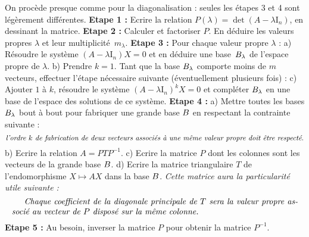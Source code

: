 On proc\`ede presque comme pour la diagonalisation : seules les \'etapes 3 et 4 sont l\'eg\`erement diff\'erentes. 
\medskip
\noindent
{\bf Etape 1 : }Ecrire la relation $P(\lambda)=\det(A-\lambda\mbox{I}_n)$, en dessinant la matrice. \medskip\noindent
\medskip
\noindent
{\bf Etape 2 : }Calculer et factoriser $P$. En d\'eduire les valeurs propres $\lambda$ et leur multiplicit\'e~$m_\lambda$.\medskip\noindent
\medskip
\noindent
{\bf Etape 3 : }Pour chaque valeur propre $\lambda$ : \pn 
a) R\'esoudre le syst\`eme $(A-\lambda\mbox{I}_n)X=0$ et en d\'eduire une base~$\sc B_\lambda$ de l'espace propre de $\lambda$. \pn
b) Prendre $k=1$. Tant que la base $\sc B_\lambda$ comporte moins de $m$ vecteurs, effectuer l'\'etape n\'ecessaire suivante (\'eventuellement plusieurs fois) :
c) Ajouter $1$ \`a $k$, r\'esoudre le syst\`eme $(A-\lambda\mbox{I}_n)^kX=0$ et compl\'eter $\sc B_\lambda$ en une base de l'espace des solutions de ce syst\`eme. 
\medskip\noindent
{\bf Etape 4 : } a) Mettre toutes les bases $\sc B_\lambda$ bout \`a bout pour fabriquer une grande base $\sc B$ en respectant la contrainte suivante : 
$$
\mbox{\it l'ordre $k$ de fabrication de deux vecteurs associ\'es \`a une m\^eme valeur propre doit \^etre respect\'e}. 
$$
b) Ecrire la relation $A=PTP^{-1}$. \pn
c) Ecrire la matrice $P$ dont les colonnes sont les vecteurs de la grande base $\sc B$. \pn
d) Ecrire la matrice triangulaire $T$ de l'endomorphisme $X\mapsto AX$ dans la base $\sc B$. \pn
{\it Cette matrice aura la particularit\'e utile suivante :}
$$ 
\vbox{\it Chaque coefficient de la diagonale principale de $T$ sera la valeur propre associ\'e au vecteur de $P$ dispos\'e sur la m\^eme colonne.} 
$$
{\bf Etape 5 : }Au besoin, inverser la matrice $P$ pour obtenir la matrice $P^{-1}$. 

